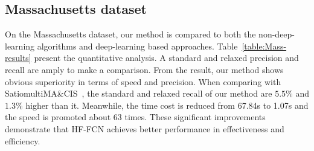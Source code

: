 \subsection{Massachusetts dataset}
On the Massachusetts dataset, our method is compared to both the non-deep-learning algorithms and deep-learning based approaches. Table~\ref{table:Mass-results} present the quantitative analysis. A standard and relaxed precision and recall are amply to make a comparison.
From the result, our method shows obvious superiority in terms of speed and precision. When comparing with Satio\-multi\-MA\&CIS~\cite{IEEEexample:saito2016multiple}, the standard and relaxed recall of our method are $5.5\%$ and $1.3\%$ higher than it. Meanwhile, the time cost is reduced from 67.84s to 1.07s and the speed is promoted about 63 times.
These significant improvements demonstrate that HF-FCN achieves better performance in effectiveness and efficiency.

